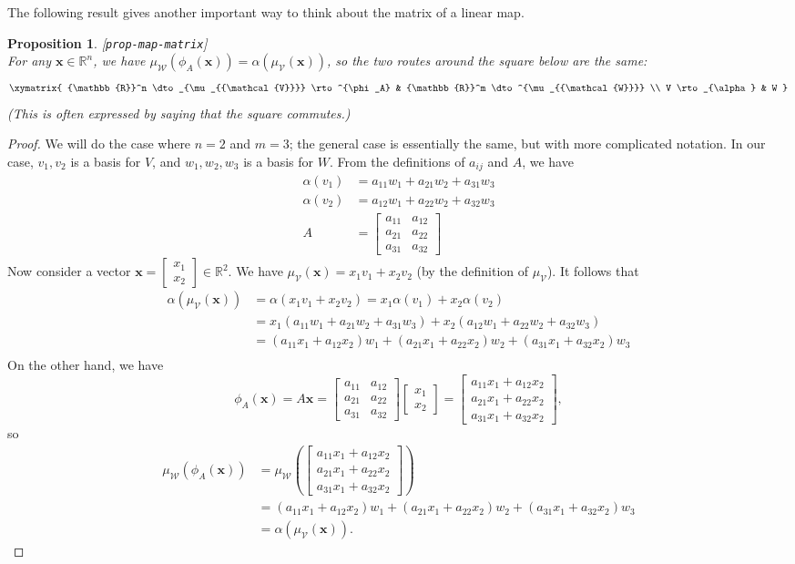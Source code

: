 \documentclass{amsart}
\newcommand{\lbl}[1]{\label{#1}\textup{[\texttt{#1}]}\ \\}
\newcommand{\lbl}{\label}
\newcommand{\R}         {{\mathbb{R}}}
\newcommand{\bbm}       {\left[\begin{matrix}}
\newcommand{\ebm}       {\end{matrix}\right]}
\newcommand{\bsm}       {\left[\begin{smallmatrix}}
\newcommand{\esm}       {\end{smallmatrix}\right]}
\newcommand{\al}        {\alpha}
\newcommand{\vx}        {\mathbf{x}}
\newcommand{\CV}        {{\mathcal{V}}}
\newcommand{\CW}        {{\mathcal{W}}}
\renewcommand{\:}       {\colon}
\newtheorem{proposition}[theorem]{Proposition}
\theoremstyle{definition}
\begin{document}
The following result gives another important way to think
about the matrix of a linear map.
\begin{proposition}\lbl{prop-map-matrix}
 For any $\vx\in\R^n$, we have
 $\mu_{\CW}(\phi_A(\vx))=\al(\mu_{\CV}(\vx))$, so the two
 routes around the square below are the same:
 \[ \xymatrix{
     \R^n \dto_{\mu_{\CV}} \rto^{\phi_A} &
     \R^m \dto^{\mu_{\CW}} \\
     V \rto_{\al} & W
 } \]
 (This is often expressed by saying that the square
 \emph{commutes}.) 
\end{proposition}
\begin{proof}
 We will do the case where $n=2$ and $m=3$; the general case
 is essentially the same, but with more complicated
 notation.  In our case, $v_1,v_2$ is a basis for $V$, and
 $w_1,w_2,w_3$ is a basis for $W$.  From the definitions of
 $a_{ij}$ and $A$, we
 have 
 \begin{align*}
  \al(v_1) &= a_{11}w_1 + a_{21}w_2 + a_{31}w_3 \\
  \al(v_2) &= a_{12}w_1 + a_{22}w_2 + a_{32}w_3 \\
  A &= \bbm a_{11} & a_{12} \\
            a_{21} & a_{22} \\
            a_{31} & a_{32} \ebm 
 \end{align*}
 Now consider a vector $\vx=\bsm x_1\\ x_2\esm\in\R^2$.  We
 have $\mu_\CV(\vx)=x_1 v_1+x_2 v_2$ (by the definition of
 $\mu_\CV$).  It follows that 
 \begin{align*}
  \al(\mu_\CV(\vx)) &= 
   \al(x_1v_1+x_2v_2) = x_1\al(v_1) + x_2\al(v_2) \\
   &= x_1(a_{11}w_1 + a_{21}w_2 + a_{31}w_3) + 
      x_2(a_{12}w_1 + a_{22}w_2 + a_{32}w_3) \\
   &= (a_{11}x_1 + a_{12}x_2) w_1 + 
      (a_{21}x_1 + a_{22}x_2) w_2 + 
      (a_{31}x_1 + a_{32}x_2) w_3 \\
 \end{align*}
 On the other hand, we have
 \[ \phi_A(\vx) = A\vx = 
     \bbm a_{11} & a_{12} \\
          a_{21} & a_{22} \\
          a_{31} & a_{32} \ebm 
     \bbm x_1 \\ x_2 \ebm =
     \bbm a_{11}x_1 + a_{12}x_2 \\
          a_{21}x_1 + a_{22}x_2 \\
          a_{31}x_1 + a_{32}x_2 \ebm,
 \]
 so 
 \begin{align*}
  \mu_\CW(\phi_A(\vx)) &= 
   \mu_{\CW}\left( \bbm a_{11}x_1 + a_{12}x_2 \\
                        a_{21}x_1 + a_{22}x_2 \\
                        a_{31}x_1 + a_{32}x_2 \ebm \right) \\
   &= (a_{11}x_1 + a_{12}x_2) w_1 + 
      (a_{21}x_1 + a_{22}x_2) w_2 + 
      (a_{31}x_1 + a_{32}x_2) w_3 \\
   &= \al(\mu_\CV(\vx)).
 \end{align*}
\end{proof}
\end{document}
